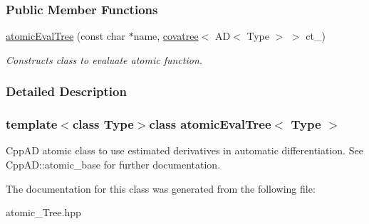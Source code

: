 \subsubsection*{Public Member Functions}
\begin{DoxyCompactItemize}
\item 
\hypertarget{classatomicEvalTree_a25bf0015d015c8798adea407be763119}{}\hyperlink{classatomicEvalTree_a25bf0015d015c8798adea407be763119}{atomic\+Eval\+Tree} (const char $\ast$name, \hyperlink{classcovatree}{covatree}$<$ A\+D$<$ Type $>$ $>$ ct\+\_\+)\label{classatomicEvalTree_a25bf0015d015c8798adea407be763119}

\begin{DoxyCompactList}\small\item\em Constructs class to evaluate atomic function. \end{DoxyCompactList}\end{DoxyCompactItemize}


\subsubsection{Detailed Description}
\subsubsection*{template$<$class Type$>$class atomic\+Eval\+Tree$<$ Type $>$}

Cpp\+A\+D atomic class to use estimated derivatives in automatic differentiation. See Cpp\+A\+D\+::atomic\+\_\+base for further documentation. 

The documentation for this class was generated from the following file\+:\begin{DoxyCompactItemize}
\item 
atomic\+\_\+\+Tree.\+hpp\end{DoxyCompactItemize}
